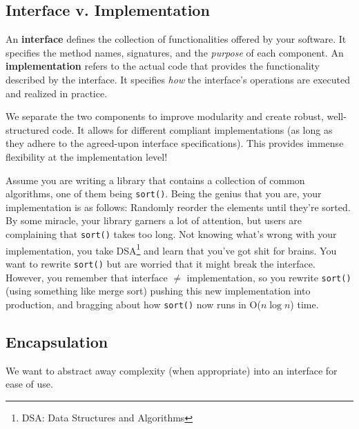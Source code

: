 \documentclass{report}
\begin{document}
\subsection*{Interface v. Implementation}
\begin{tcolorbox}[title=Definition: Interface and Implementation]
  An \textbf{interface} defines the collection of functionalities offered by your software. It
  specifies the method names, signatures, and the \textit{purpose} of each component. 
  \tcblower
  An \textbf{implementation} refers to the actual code that provides the functionality described by
  the interface. It specifies \textit{how} the interface's operations are executed and realized in practice. 
\end{tcolorbox}
We separate the two components to improve modularity and create robust, well-structured code. It
allows for different compliant implementations (as long as they adhere to the agreed-upon interface
specifications). This provides immense flexibility at the implementation level!

\begin{tcolorbox}[colback=blue!5!white,colframe=black!75!blue,title=Example: Sort Swapping]
  Assume you are writing a library that contains a collection of common algorithms, one of them
  being \texttt{sort()}. Being the genius that you are, your implementation is as follows: Randomly
  reorder the elements until they're sorted. By some miracle, your library garners a lot of
  attention, but users are complaining that \texttt{sort()} takes too long. Not knowing what's wrong
  with your implementation, you take DSA\footnote[1]{DSA: Data Structures and Algorithms} 
  and learn that you've got shit for brains. You want to rewrite \texttt{sort()} but are worried
  that it might break the interface. However, you remember that interface $\neq$ implementation, so
  you rewrite \texttt{sort()} (using something like merge sort) pushing this new implementation
  into production, and bragging about how \texttt{sort()} now runs in O($n \log n$) time. 
\end{tcolorbox}

\subsection*{Encapsulation}
We want to abstract away complexity (when appropriate) into an interface for ease of use.
\end{document}
